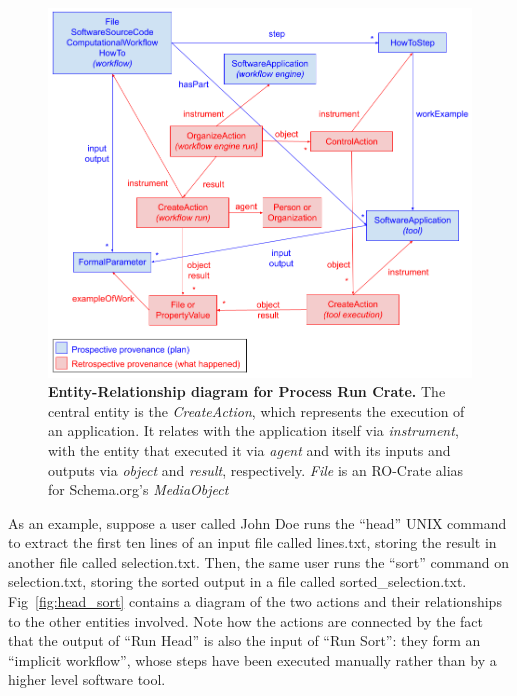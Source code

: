 \documentclass[10pt,letterpaper]{article}
\begin{document}
\begin{figure}[!h]
\includegraphics[width=\textwidth]{image1.png}
\caption{{\bf Entity-Relationship diagram for Process Run Crate.}
The central entity is the \emph{CreateAction}, which represents the execution of an application.
It relates with the application itself via \emph{instrument}, with the entity that executed it via \emph{agent} and with its inputs and outputs via \emph{object}
and \emph{result}, respectively. 
\emph{File} is an RO-Crate alias for Schema.org's \emph{MediaObject}}
\label{fig:process_crate_er}
\end{figure}

As an example,
suppose a user called John Doe runs the ``head'' UNIX command to extract the first ten lines of an input file called lines.txt, storing the result in another file called selection.txt.
Then, the same user runs the ``sort''
command on selection.txt, storing the sorted output in a file called sorted\_selection.txt.
Fig~\ref{fig:head_sort} contains a diagram of the two actions and their relationships to the other entities involved.
Note how the actions are connected by the fact that the output of ``Run Head'' is also the input of ``Run Sort'': they form an ``implicit workflow'', whose steps have been executed manually rather than by a higher level software tool.

\end{document}
